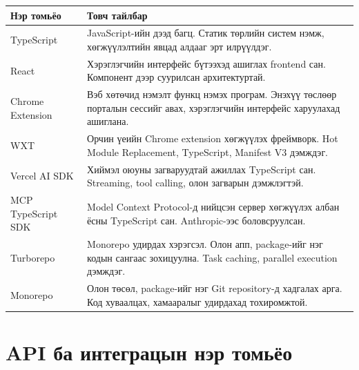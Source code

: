 \begin{table}[H]
  \centering
  \begin{tabularx}{\textwidth}{>{\raggedright\arraybackslash}p{4.5cm} X}
    \toprule
    Нэр томьёо & Товч тайлбар \\
    \midrule
    TypeScript & JavaScript-ийн дээд багц. Статик төрлийн систем нэмж, хөгжүүлэлтийн явцад алдааг эрт илрүүлдэг. \\
    \addlinespace
    React & Хэрэглэгчийн интерфейс бүтээхэд ашиглах frontend сан. Компонент дээр суурилсан архитектуртай. \\
    \addlinespace
    Chrome Extension & Вэб хөтөчид нэмэлт функц нэмэх програм. Энэхүү төслөөр порталын сессийг авах, хэрэглэгчийн интерфейс харуулахад ашиглана. \\
    \addlinespace
    WXT & Орчин үеийн Chrome extension хөгжүүлэх фреймворк. Hot Module Replacement, TypeScript, Manifest V3 дэмждэг. \\
    \addlinespace
    Vercel AI SDK & Хиймэл оюуны загваруудтай ажиллах TypeScript сан. Streaming, tool calling, олон загварын дэмжлэгтэй. \\
    \addlinespace
    MCP TypeScript SDK & Model Context Protocol-д нийцсэн сервер хөгжүүлэх албан ёсны TypeScript сан. Anthropic-ээс боловсруулсан. \\
    \addlinespace
    Turborepo & Monorepo удирдах хэрэгсэл. Олон апп, package-ийг нэг кодын сангаас зохицуулна. Task caching, parallel execution дэмждэг. \\
    \addlinespace
    Monorepo & Олон төсөл, package-ийг нэг Git repository-д хадгалах арга. Код хуваалцах, хамааралыг удирдахад тохиромжтой. \\
    \bottomrule
  \end{tabularx}
\end{table}

\section*{API ба интеграцын нэр томьёо}

